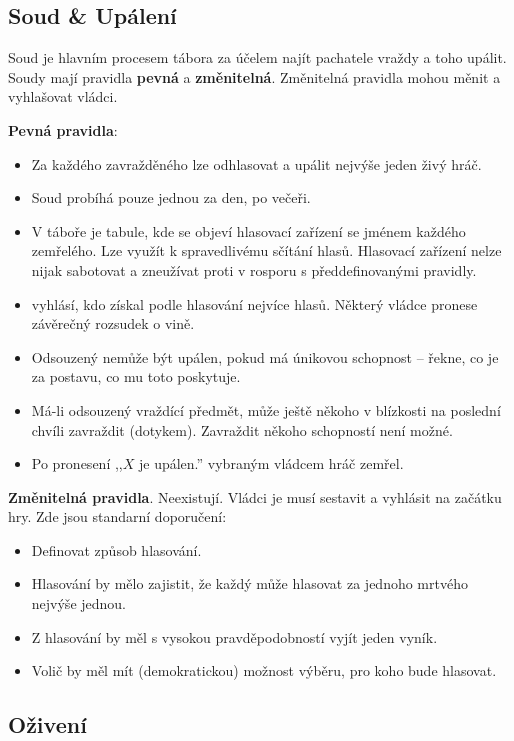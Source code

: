 \documentclass[11pt]{article} %
\newcommand{\albert}{\Nursey[][yellow][blue][red]}
\begin{document}
\subsection{Soud \& Upálení}

Soud je hlavním procesem tábora za účelem najít pachatele vraždy a toho upálit.
Soudy mají pravidla \textbf{pevná} a \textbf{změnitelná}.
Změnitelná pravidla mohou měnit a vyhlašovat vládci.

\textbf{Pevná pravidla}:
\begin{itemize}
    \item Za každého zavražděného lze odhlasovat a upálit nejvýše jeden živý hráč.
    \item Soud probíhá pouze jednou za den, po večeři.
    \item V táboře je tabule, kde se objeví hlasovací zařízení se jménem každého zemřelého. Lze využít \albert k spravedlivému sčítání hlasů. Hlasovací zařízení nelze nijak sabotovat a zneužívat proti v rosporu s předdefinovanými pravidly.
    \item \albert vyhlásí, kdo získal podle hlasování nejvíce hlasů. Některý vládce pronese závěrečný rozsudek o vině.
	\item Odsouzený nemůže být upálen, pokud má únikovou schopnost -- řekne, co je za postavu, co mu toto poskytuje.
	\item Má-li odsouzený vraždící předmět, může ještě někoho v blízkosti na poslední chvíli zavraždit (dotykem). Zavraždit někoho schopností není možné.
    \item Po pronesení  ,,$X$ je upálen.'' vybraným vládcem hráč zemřel.
\end{itemize}

\textbf{Změnitelná pravidla}. Neexistují. Vládci je musí sestavit a vyhlásit na začátku hry.
Zde jsou standarní doporučení:
{\small
\begin{itemize}
    \item Definovat způsob hlasování.
    \item Hlasování by mělo zajistit, že každý může hlasovat za jednoho mrtvého nejvýše jednou.
    \item Z hlasování by měl s vysokou pravděpodobností vyjít jeden vyník.
    \item Volič by měl mít (demokratickou) možnost výběru, pro koho bude hlasovat.
\end{itemize}
}

\subsection{Oživení}
\end{document}
